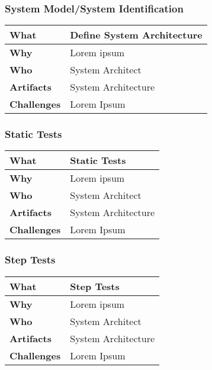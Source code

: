 \subsubsection{System Model/System Identification}
\begin{minipage}{\textwidth}
	 \label{table:ch6_Task_Controler_Tuning} 
	\begin{tabular}
		{|m{3cm}|m{10cm}|} \hline \bfseries What & Define System Architecture\\
		\hline \bfseries Why & Lorem ipsum\\
		\hline \bfseries Who & System Architect\\
		\hline \bfseries Artifacts & System Architecture\\
		\hline \bfseries Challenges & Lorem Ipsum\\
		\hline 
	\end{tabular}
\end{minipage}

\subsubsection{Static Tests}
\begin{minipage}{\textwidth}
 \label{table:ch6_Task_Static_Tests}
\begin{tabular}
	{|m{3cm}|m{10cm}|} \hline \bfseries What & Static Tests\\
	\hline \bfseries Why & Lorem ipsum\\
	\hline \bfseries Who & System Architect\\
	\hline \bfseries Artifacts & System Architecture\\
	\hline \bfseries Challenges & Lorem Ipsum\\
	\hline 
\end{tabular}
\end{minipage}

\subsubsection{Step Tests}
\begin{minipage}{\textwidth}
 \label{table:ch6_Task_Step_Tests}
\begin{tabular}
	{|m{3cm}|m{10cm}|} \hline \bfseries What & Step Tests\\
	\hline \bfseries Why & Lorem ipsum\\
	\hline \bfseries Who & System Architect\\
	\hline \bfseries Artifacts & System Architecture\\
	\hline \bfseries Challenges & Lorem Ipsum\\
	\hline 
\end{tabular}
\end{minipage}

